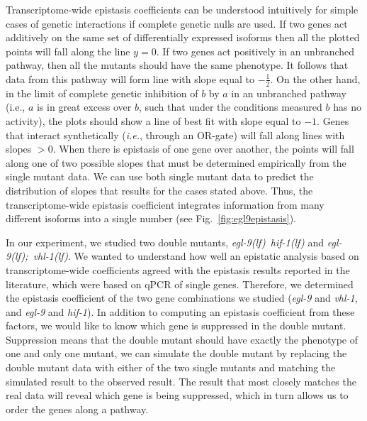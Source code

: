\documentclass[9pt,twocolumn,twoside]{pnas-new}
\newcommand{\gene}[1]{\mbox{\emph{#1}}}
\newcommand{\eglvhl}{\gene{egl-9(lf); vhl-1(lf)}}
\newcommand{\eglhif}{\gene{egl-9(lf) hif-1(lf)}}
\begin{document}
Transcriptome-wide epistasis coefficients can be understood intuitively for
simple cases of genetic interactions if complete genetic nulls are used. If two
genes act additively on the same set of differentially expressed isoforms then
all the plotted points will fall along the line $y=0$. If two genes act
positively in an unbranched pathway, then all the mutants should have the same
phenotype. It follows that data from this pathway will form line with slope
equal to $-\frac{1}{2}$. On the other hand, in the limit of complete genetic
inhibition of $b$ by $a$ in an unbranched pathway (i.e., $a$ is in great excess
over $b$, such that under the conditions measured $b$ has no activity), the
plots should show a line of best fit with slope equal to $-1$. Genes that
interact synthetically (\emph{i.e.}, through an OR-gate) will fall along lines
with slopes $>0$. When there is epistasis of one gene over another, the points
will fall along one of two possible slopes that must be determined empirically
from the single mutant data. We can use both single mutant data to predict the
distribution of slopes that results for the cases stated above. Thus, the
transcriptome-wide epistasis coefficient integrates information from many
different isoforms into a single number (see Fig.~\ref{fig:egl9epistasis}).

In our experiment, we studied two double mutants, \eglhif{} and \eglvhl{}. We
wanted to understand how well an epistatic analysis based on transcriptome-wide
coefficients agreed with the epistasis results reported in the literature, which
were based on qPCR of single genes. Therefore, we determined the epistasis
coefficient of the two gene combinations we studied (\gene{egl-9} and
\gene{vhl-1}, and \gene{egl-9} and \gene{hif-1}). In addition to computing an
epistasis coefficient from these factors, we would like to know which gene is
suppressed in the double mutant. Suppression means that the double mutant
should have exactly the phenotype of one and only one mutant, we can simulate
the double mutant by replacing the double mutant data with either of the two
single mutants and matching the simulated result to the observed result. The
result that most closely matches the real data will reveal which gene is being
suppressed, which in turn allows us to order the genes along a pathway.
\color{black}
\end{document}
